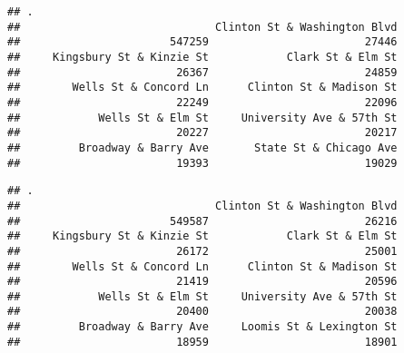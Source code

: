 \documentclass[
]{article}
\newenvironment{Shaded}{\begin{snugshade}}{\end{snugshade}}
\newcommand{\AttributeTok}[1]{\textcolor[rgb]{0.13,0.29,0.53}{#1}}
\newcommand{\ConstantTok}[1]{\textcolor[rgb]{0.56,0.35,0.01}{#1}}
\newcommand{\DecValTok}[1]{\textcolor[rgb]{0.00,0.00,0.81}{#1}}
\newcommand{\DocumentationTok}[1]{\textcolor[rgb]{0.56,0.35,0.01}{\textbf{\textit{#1}}}}
\newcommand{\FunctionTok}[1]{\textcolor[rgb]{0.13,0.29,0.53}{\textbf{#1}}}
\newcommand{\NormalTok}[1]{#1}
\newcommand{\OtherTok}[1]{\textcolor[rgb]{0.56,0.35,0.01}{#1}}
\newcommand{\SpecialCharTok}[1]{\textcolor[rgb]{0.81,0.36,0.00}{\textbf{#1}}}
\newcommand{\StringTok}[1]{\textcolor[rgb]{0.31,0.60,0.02}{#1}}
\begin{document}
\begin{verbatim}
## .
##                              Clinton St & Washington Blvd 
##                       547259                        27446 
##     Kingsbury St & Kinzie St            Clark St & Elm St 
##                        26367                        24859 
##        Wells St & Concord Ln      Clinton St & Madison St 
##                        22249                        22096 
##            Wells St & Elm St     University Ave & 57th St 
##                        20227                        20217 
##         Broadway & Barry Ave       State St & Chicago Ave 
##                        19393                        19029
\end{verbatim}

\begin{Shaded}
\end{Shaded}

\begin{verbatim}
## .
##                              Clinton St & Washington Blvd 
##                       549587                        26216 
##     Kingsbury St & Kinzie St            Clark St & Elm St 
##                        26172                        25001 
##        Wells St & Concord Ln      Clinton St & Madison St 
##                        21419                        20596 
##            Wells St & Elm St     University Ave & 57th St 
##                        20400                        20038 
##         Broadway & Barry Ave     Loomis St & Lexington St 
##                        18959                        18901
\end{verbatim}
\end{document}
